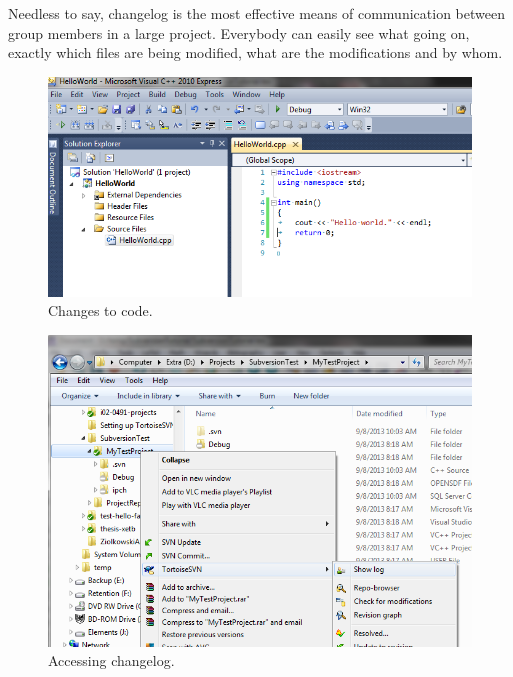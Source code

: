\documentclass[12pt,a4paper]{article}
\begin{document}
Needless to say, changelog is the most effective means of communication between group members in a large project. Everybody can easily see what going on, exactly which files are being modified, what are the modifications and by whom.
\begin{figure}[H]
\centering
\includegraphics[scale=0.75]{MainChanged.png}
\caption{Changes to code.}
\label{Main-changed}
\end{figure}
\begin{figure}[H]
\centering
\includegraphics[scale=0.75]{ShowLog.png}
\caption{Accessing changelog.}
\label{show-log}
\end{figure}
\end{document}

